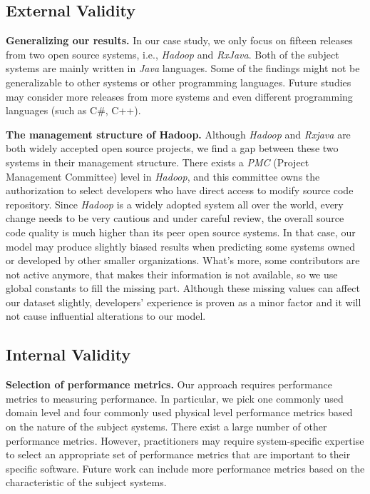 \subsection{External Validity}

\textbf{Generalizing our results. }In our case study, we only focus on fifteen releases from two open source systems, i.e., \emph{Hadoop} and \emph{RxJava}. Both of the subject systems are mainly written in \emph{Java} languages. Some of the findings might not be generalizable to other systems or other programming languages. Future studies may consider more releases from more systems and even different programming languages (such as C\#, C++). 

\textbf{The management structure of Hadoop.} Although \emph{Hadoop} and \emph{Rxjava} are both widely accepted open source projects, we find a gap between these two systems in their management structure. There exists a \emph{PMC} (Project Management Committee) level in \emph{Hadoop}, and this committee owns the authorization to select developers who have direct access to modify source code repository. Since \emph{Hadoop} is a widely adopted system all over the world, every change needs to be very cautious and under careful review, the overall source code quality is much higher than its peer open source systems. In that case, our model may produce slightly biased results when predicting some systems owned or developed by other smaller organizations. What's more, some contributors are not active anymore, that makes their information is not available, so we use global constants to fill the missing part. Although these missing values can affect our dataset slightly, developers' experience is proven as a minor factor and it will not cause influential alterations to our model.

\subsection{Internal Validity}

\textbf{Selection of performance metrics.} Our approach requires performance metrics to measuring performance. In particular, we pick one commonly used domain level and four commonly used physical level performance metrics based on the nature of the subject systems. There exist a large number of other performance metrics. However, practitioners may require system-specific expertise to select an appropriate set of performance metrics that are important to their specific software. Future work can include more performance metrics based on the characteristic of the subject systems. 

